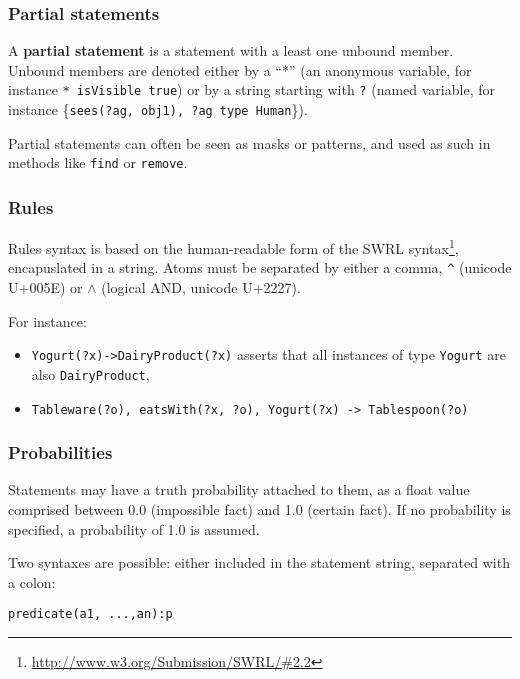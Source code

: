 \subsubsection{Partial statements}

A \textbf{partial statement} is a statement with a least one unbound member.
Unbound members are denoted either by a ``*'' (an anonymous variable, for
instance \texttt{* isVisible true}) or by a string starting with \texttt{?}
(named variable, for instance \{\texttt{sees(?ag, obj1), ?ag type Human}\}).

Partial statements can often be seen as masks or patterns, and used as such in
methods like \texttt{find} or \texttt{remove}.

\subsubsection{Rules}

Rules syntax is based on the human-readable form of the SWRL
syntax\footnote{\url{http://www.w3.org/Submission/SWRL/\#2.2}}, encapuslated
in a string. Atoms must be separated by either a comma, \texttt{\^{ }} (unicode
U+005E) or \texttt{{$\land$}} (logical AND, unicode U+2227).

For instance:

\begin{itemize}

    \item {\tt Yogurt(?x)->DairyProduct(?x)} asserts that all instances of type
    {\tt Yogurt} are also {\tt DairyProduct},

    \item {\tt Tableware(?o), eatsWith(?x, ?o), Yogurt(?x) -> Tablespoon(?o)}

\end{itemize}

\subsubsection{Probabilities}

Statements may have a truth probability attached to them, as a float value
comprised between 0.0 (impossible fact) and 1.0 (certain fact). If no
probability is specified, a probability of 1.0 is assumed.

Two syntaxes are possible: either included in the statement string, separated
with a colon:

\begin{center} \tt predicate(a1, ...,an):p \end{center}

